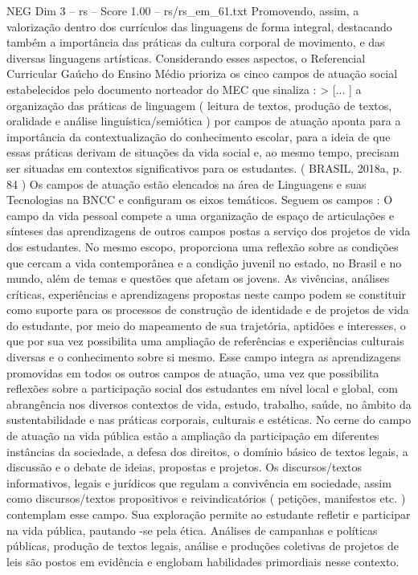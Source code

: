 \begin{textsample}{NEG Dim 3 – rs – Score 1.00 – rs/rs\_em\_61.txt}
Promovendo, assim, a valorização dentro dos currículos das linguagens de forma integral, destacando também a importância das práticas da cultura corporal de movimento, e das diversas linguagens artísticas.
Considerando esses aspectos, o Referencial Curricular Gaúcho do Ensino Médio prioriza os cinco campos de atuação social estabelecidos pelo documento norteador do MEC que sinaliza : > [... ] a organização das práticas de linguagem ( leitura de textos, produção de textos, oralidade e análise linguística/semiótica ) por campos de atuação aponta para a importância da contextualização do conhecimento escolar, para a ideia de que essas práticas derivam de situações da vida social e, ao mesmo tempo, precisam ser situadas em contextos significativos para os estudantes. ( BRASIL, 2018a, p. 84 ) Os campos de atuação estão elencados na área de Linguagens e suas Tecnologias na BNCC e configuram os eixos temáticos.
Seguem os campos : O campo da vida pessoal compete a uma organização de espaço de articulações e sínteses das aprendizagens de outros campos postas a serviço dos projetos de vida dos estudantes.
No mesmo escopo, proporciona uma reflexão sobre as condições que cercam a vida contemporânea e a condição juvenil no estado, no Brasil e no mundo, além de temas e questões que afetam os jovens.
As vivências, análises críticas, experiências e aprendizagens propostas neste campo podem se constituir como suporte para os processos de construção de identidade e de projetos de vida do estudante, por meio do mapeamento de sua trajetória, aptidões e interesses, o que por sua vez possibilita uma ampliação de referências e experiências culturais diversas e o conhecimento sobre si mesmo.
Esse campo integra as aprendizagens promovidas em todos os outros campos de atuação, uma vez que possibilita reflexões sobre a participação social dos estudantes em nível local e global, com abrangência nos diversos contextos de vida, estudo, trabalho, saúde, no âmbito da sustentabilidade e nas práticas corporais, culturais e estéticas.
No cerne do campo de atuação na vida pública estão a ampliação da participação em diferentes instâncias da sociedade, a defesa dos direitos, o domínio básico de textos legais, a discussão e o debate de ideias, propostas e projetos.
Os discursos/textos informativos, legais e jurídicos que regulam a convivência em sociedade, assim como discursos/textos propositivos e reivindicatórios ( petições, manifestos etc. ) contemplam esse campo.
Sua exploração permite ao estudante refletir e participar na vida pública, pautando -se pela ética.
Análises de campanhas e políticas públicas, produção de textos legais, análise e produções coletivas de projetos de leis são postos em evidência e englobam habilidades primordiais nesse contexto.

\end{textsample}
